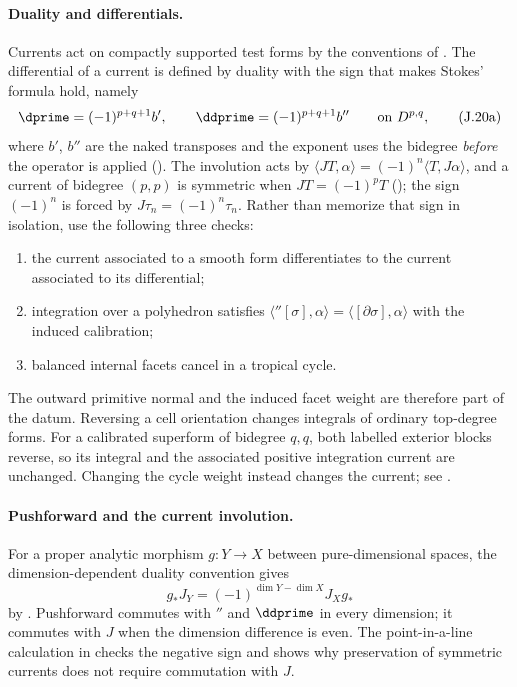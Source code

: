 \paragraph{Duality and differentials.}
\label{sec:appJ-duality}
Currents act on compactly supported test forms by the conventions of
.  The differential of a
current is defined by duality with the sign that makes Stokes' formula hold,
namely
\begin{equation*}
 \dprime=(-1)^{p+q+1}b',
 \qquad
 \ddprime=(-1)^{p+q+1}b''
 \qquad\text{on }D^{p,q},
 \tag{J.20a}\label{eq:appJ-current-differential}
\end{equation*}
where \(b'\), \(b''\) are the naked transposes and the exponent uses the
bidegree \emph{before} the operator is applied
().  The involution acts by
\(\langle JT,\alpha\rangle=(-1)^n\langle T,J\alpha\rangle\), and a current of
bidegree \((p,p)\) is symmetric when \(JT=(-1)^pT\)
(); the sign \((-1)^n\) is forced by
\(J\tau_n=(-1)^n\tau_n\).  Rather than memorize that sign in
isolation, use the following three checks:
\begin{enumerate}
\item the current associated to a smooth form differentiates to the current
  associated to its differential;
\item integration over a polyhedron satisfies
  \(\langle \dprime[\sigma],\alpha\rangle
    =\langle[\partial\sigma],\alpha\rangle\) with the induced calibration;
\item balanced internal facets cancel in a tropical cycle.
\end{enumerate}
The outward primitive normal and the induced facet weight are therefore part
of the datum.  Reversing a cell orientation changes integrals of ordinary top-degree
forms. For a calibrated superform of bidegree \(q,q\), both labelled
exterior blocks reverse, so its integral and the associated positive
integration current are unchanged. Changing the cycle weight instead
changes the current; see .

\paragraph{Pushforward and the current involution.}
\label{sec:appJ-pushforward}
For a proper analytic morphism \(g:Y\to X\) between pure-dimensional
spaces, the dimension-dependent duality convention gives
\[
                  g_*J_Y=(-1)^{\dim Y-\dim X}J_Xg_*
\]
by .  Pushforward commutes with
\(\dprime\) and \(\ddprime\) in every dimension; it commutes with \(J\) when
the dimension difference is even.  The point-in-a-line calculation in
 checks the negative sign and shows why
preservation of symmetric currents does not require commutation with \(J\).

